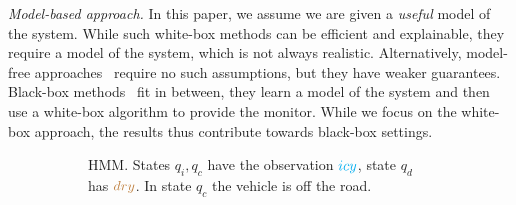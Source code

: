 \documentclass[runningheads]{llncs}
\newcommand{\icy}{{\color{cyan} icy}\xspace}
\newcommand{\dry}{{\color{brown} dry}\xspace}
\renewcommand{\paragraph}[1]{\smallskip\noindent\emph{#1}}
\begin{document}
\paragraph{Model-based approach.}
In this paper, we assume we are given a \emph{useful} model of the system.  While such white-box methods can be efficient and explainable, they require a model of the system, which is not always realistic. Alternatively, model-free approaches~\cite{cairoliNeuralPredictiveMonitoring2021} require no such assumptions, but they have weaker guarantees. Black-box methods~\cite{babaeeEmphPreventPredictiveRunTime2018} fit in between, they learn a model of the system and then use a white-box algorithm to provide the monitor. While we focus on the white-box approach, the results thus contribute towards black-box settings.


\begin{figure}[t]
    \begin{subfigure}{0.4\textwidth}
        \caption{HMM. States $q_i, q_c$ have the observation $\icy$, state $q_d$ has $\dry$. In state $q_c$ the vehicle is off the road.}
        \label{fig:centralhmm}
    \end{subfigure}
    \hfill
    \begin{subfigure}{0.55\textwidth}
        \center
\end{subfigure}
\end{figure}
\end{document}
